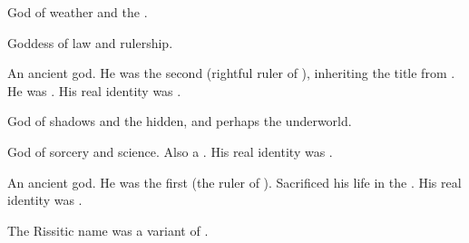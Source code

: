   
\begin{gloss}
  \begin{comment}
  \subparagraph{Daxian}
  \end{comment}
  God of weather and the \Wylde{}. 
  
  
  
  \begin{comment}
  \subparagraph{Isxae}
  \end{comment}
  Goddess of law and rulership. 
  
  
  
  \begin{comment}
  \subparagraph{\Mezzagrael}
  \end{comment}
  \gitemlink[Mezzagrael]{\Mezzagrael}
  \index{\Mezzagrael}
  An ancient god. 
  He was the second \Nechsain (rightful ruler of \Miith), inheriting the title from . 
  He was .
  His real identity was .  
  
  
  
  \begin{comment}
  \subparagraph{\Nasshikerr}
  \end{comment}
  \gitemlink[Nasshikerr]{\Nasshikerr}
  \index{\Nasshikerr}
  God of shadows and the hidden, and perhaps the underworld. 
  
  
  
  \begin{comment}
  \subparagraph{Rissit}
  \end{comment}
  God of sorcery and science. 
  Also a .
  His real identity was . 
  
  
  
  \begin{comment}
  \subparagraph{\Settras}
  \end{comment}
  \gitemlink[Settras]{\Settras}
  \index{\Settras}
  An ancient god. 
  He was the first \Nechsain (the ruler of \Miith).
  Sacrificed his life in the . 
  His real identity was . 
  
  The Rissitic name  was a variant of \quo{\Settras}. 




\end{gloss}
